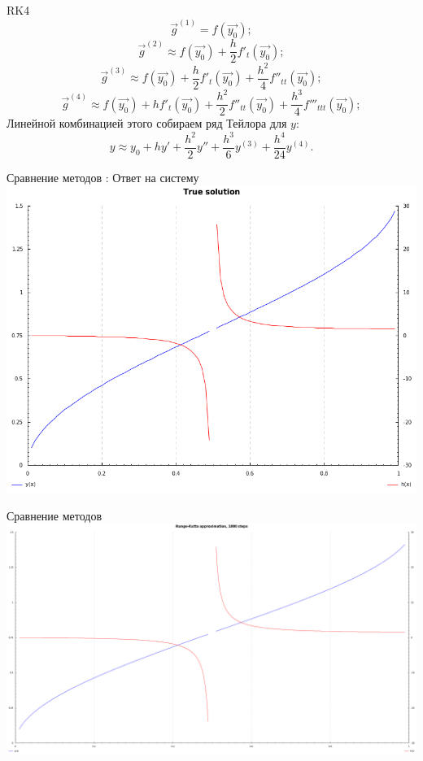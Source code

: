 \documentclass{beamer}
\begin{document}
\begin{frame}{RK4}
	\[ \vec{g}^{(1)} = f(\vec{y_0}); \]
	\[ \vec{g}^{(2)} \approx f(\vec{y_0}) + \frac{h}{2}f'_t(\vec{y_0}); \]
	\[ \vec{g}^{(3)} \approx f(\vec{y_0}) + \frac{h}{2}f'_t(\vec{y_0}) + \frac{h^2}{4}f''_{tt}(\vec{y_0}); \]
	\[ \vec{g}^{(4)} \approx f(\vec{y_0}) + hf'_t(\vec{y_0}) + \frac{h^2}{2}f''_{tt}(\vec{y_0}) + \frac{h^3}{4}f'''_{ttt}(\vec{y_0});\]
	\pause Линейной комбинацией этого собираем ряд Тейлора для $y$:
	\[y \approx y_0 + hy' + \frac{h^2}{2}y'' + \frac{h^3}{6}y^{(3)} + \frac{h^4}{24}y^{(4)}. \]

\end{frame}

\begin{frame}{Сравнение методов : Ответ на систему}
    \includegraphics[scale=0.40]{solution}
\end{frame}

\begin{frame}{Сравнение методов}
    \includegraphics[scale=0.17]{runge1000}
\end{frame}
\end{document}
